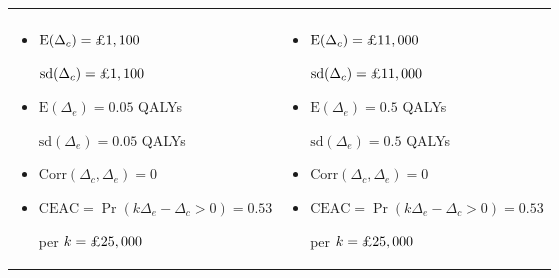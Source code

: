 \begin{frame}
\begin{tabular}{p{5.8cm}p{5.8cm}}
\begin{minipage}[r]{5.5cm}
    \end{minipage} \\[-5pt]
    \fontsize{8}{8}\selectfont
    \begin{itemize}
        \item $\mbox{E}(\Delta_c)=\textrm{\pounds} 1,100$ \par $\mbox{sd}(\Delta_c)=\textrm{\pounds} 1,100$
        \item $\mbox{E}(\Delta_e)= 0.05$ QALYs \par $\mbox{sd}(\Delta_e)=0.05$ QALYs
        \item $\mbox{Corr}(\Delta_c,\Delta_e)=0$
        \item $\mbox{CEAC} = \Pr\left(k\Delta_e-\Delta_c>0\right)=0.53$ \par per
        $k=\textrm{\pounds}
        25,000$
    \end{itemize}
    &
    \fontsize{8}{8}\selectfont
    \begin{itemize}
        \item $\mbox{E}(\Delta_c)=\textrm{\pounds} 11,000$ \par $\mbox{sd}(\Delta_c)=\textrm{\pounds} 11,000$
        \item $\mbox{E}(\Delta_e)= 0.5$ QALYs \par $\mbox{sd}(\Delta_e)=0.5$ QALYs
        \item $\mbox{Corr}(\Delta_c,\Delta_e)=0$
        \item $\mbox{CEAC} = \Pr\left(k\Delta_e-\Delta_c>0\right)=0.53$ \par per
        $k=\textrm{\pounds}
        25,000$
    \end{itemize}
\end{tabular}
\end{frame}

